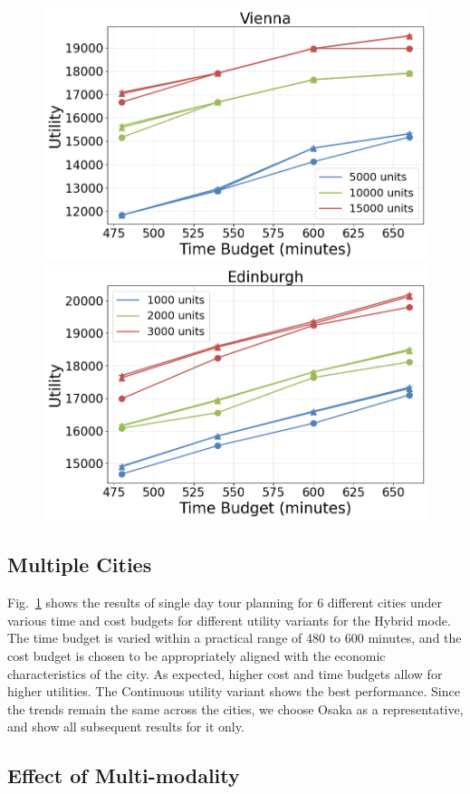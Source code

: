 \begin{figure}[t]
    \includegraphics[width=0.65\columnwidth]{plots/exp1-vienna.png}
    \includegraphics[width=0.65\columnwidth]{plots/exp1-edinburgh.png}
    \label{fig:cities}
\end{figure}

\subsection{Multiple Cities}

Fig.~\ref{fig:cities} shows the results of single day tour planning for 6 different cities under various time and cost budgets for different utility variants for the Hybrid mode.
The time budget is varied within a practical range of 480 to 600 minutes, and the cost budget is chosen to be appropriately aligned with the economic characteristics of the city.
As expected, higher cost and time budgets allow for higher utilities.
The Continuous utility variant shows the best performance.
Since the trends remain the same across the cities, we choose Osaka as a representative, and show all subsequent results for it only.

\subsection{Effect of Multi-modality}

